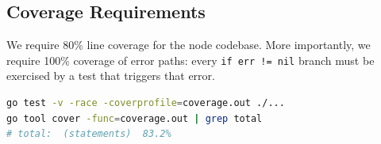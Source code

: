 \subsection{Coverage Requirements}

We require 80\% line coverage for the node codebase. More importantly, we require 100\%
coverage of error paths: every \texttt{if err != nil} branch must be exercised by a test
that triggers that error.

\begin{lstlisting}[language=bash,caption={Running Go tests with coverage}]
go test -v -race -coverprofile=coverage.out ./...
go tool cover -func=coverage.out | grep total
# total:  (statements)  83.2%
\end{lstlisting}

